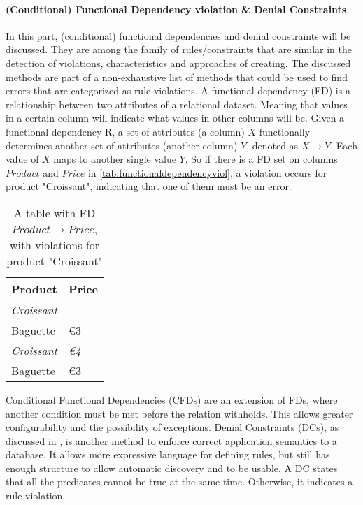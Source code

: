 \paragraph{(Conditional) Functional Dependency violation \& Denial Constraints}
In this part, (conditional) functional dependencies and denial constraints will be discussed. They are among the family of rules/constraints that are similar in the detection of violations, characteristics and approaches of creating. The discussed methods are part of a non-exhaustive list of methods that could be used to find errors that are categorized as rule violations. 
A functional dependency (FD) is a relationship between two attributes of a relational dataset. Meaning that values in a certain column will indicate what values in other columns will be. Given a functional dependency R, a set of attributes (a column) $X$ functionally determines another set of attributes (another column) $Y$, denoted as $X \rightarrow Y$. Each value of $X$ maps to another single value $Y$. So if there is a FD set on columns $Product$ and $Price$ in \autoref{tab:functionaldependencyviol}, a violation occurs for product "Croissant", indicating that one of them must be an error.

\begin{table}[]
\centering
\begin{tabular}{ll}
\textbf{Product}   & \textbf{Price} \\ \hline
\textit{Croissant} & \textit{\texteuro 2}    \\
Baguette           & €3             \\
\textit{Croissant} & \textit{€4}    \\
Baguette           & €3            
\end{tabular}
\caption{A table with FD $Product \rightarrow Price$, with violations for product "Croissant"}
\label{tab:functionaldependencyviol}
\end{table}

Conditional Functional Dependencies (CFDs) are an extension of FDs, where another condition must be met before the relation withholds. This allows greater configurability and the possibility of exceptions. Denial Constraints (DCs), as discussed in \cite{Chu2013-qe}, is another method to enforce correct application semantics to a database. It allows more expressive language for defining rules, but still has enough structure to allow automatic discovery and to be usable. A DC states that all the predicates cannot be true at the same time. Otherwise, it indicates a rule violation.

